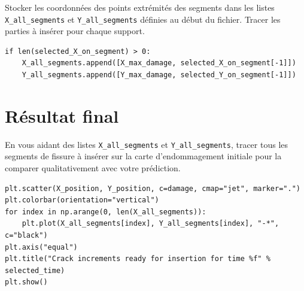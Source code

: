 \documentclass[french,12pt]{exam}
\begin{document}
\begin{questions}
\question Stocker les coordonnées des points extrémités des segments dans les listes \texttt{X\_all\_segments} et \texttt{Y\_all\_segments} définies au début du fichier. Tracer les parties à insérer pour chaque support.

\begin{solution}
\begin{lstlisting}
if len(selected_X_on_segment) > 0:
    X_all_segments.append([X_max_damage, selected_X_on_segment[-1]])
    Y_all_segments.append([Y_max_damage, selected_Y_on_segment[-1]])
\end{lstlisting}
\end{solution}
\end{questions}

\section{Résultat final}
\begin{questions}
\question En vous aidant des listes \texttt{X\_all\_segments} et \texttt{Y\_all\_segments}, tracer tous les segments de fissure à insérer sur la carte d'endommagement initiale pour la comparer qualitativement avec votre prédiction.
\begin{solution}
\begin{lstlisting}
plt.scatter(X_position, Y_position, c=damage, cmap="jet", marker=".")
plt.colorbar(orientation="vertical")
for index in np.arange(0, len(X_all_segments)):
    plt.plot(X_all_segments[index], Y_all_segments[index], "-*", c="black")
plt.axis("equal")
plt.title("Crack increments ready for insertion for time %f" % selected_time)
plt.show()
\end{lstlisting}
\end{solution}
\end{questions}
\end{document}
